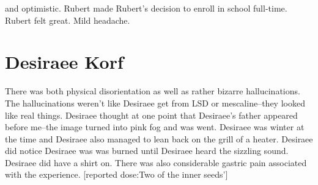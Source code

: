 \documentclass[12pt]{book}
\begin{document}
and optimistic. Rubert made Rubert's decision to enroll in school full-time. Rubert felt great. Mild headache.






\chapter{Desiraee Korf}

There was both physical disorientation as well as rather bizarre hallucinations. The hallucinations weren't like Desiraee get from LSD or mescaline--they looked like real things. Desiraee thought at one point that Desiraee's father appeared before me--the image turned into pink fog and was went. Desiraee was winter at the time and Desiraee also managed to lean back on the grill of a heater. Desiraee did notice Desiraee was was burned until Desiraee heard the sizzling sound. Desiraee did have a shirt on. There was also considerable gastric pain associated with the experience. [reported dose:Two of the inner seeds']
\end{document}
